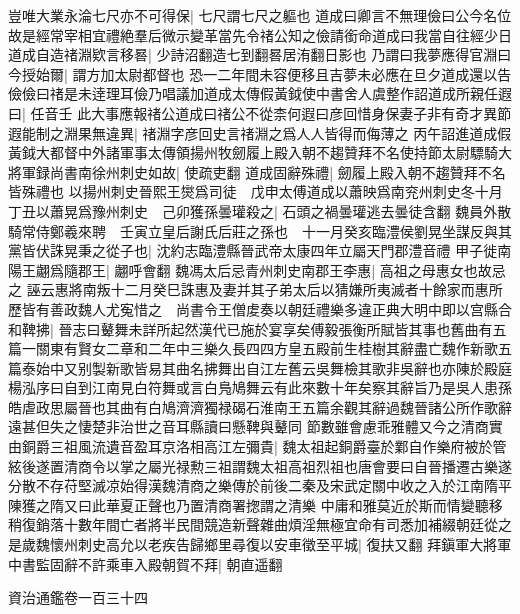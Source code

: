 豈唯大業永淪七尺亦不可得保|{
	七尺謂七尺之軀也}
道成曰卿言不無理儉曰公今名位故是經常宰相宜禮絶羣后微示變革當先令禇公知之儉請銜命道成曰我當自往經少日道成自造禇淵欵言移晷|{
	少詩沼翻造七到翻晷居洧翻日影也}
乃謂曰我夢應得官淵曰今授始爾|{
	謂方加太尉都督也}
恐一二年間未容便移且吉夢未必應在旦夕道成還以告儉儉曰禇是未逹理耳儉乃唱議加道成太傳假黃鉞使中書舍人虞整作詔道成所親任遐曰|{
	任音壬}
此大事應報禇公道成曰禇公不從柰何遐曰彦回惜身保妻子非有奇才異節遐能制之淵果無違異|{
	禇淵字彦回史言禇淵之爲人人皆得而侮薄之}
丙午詔進道成假黃鉞大都督中外諸軍事太傳領揚州牧劒履上殿入朝不趨贊拜不名使持節太尉驃騎大將軍録尚書南徐州刺史如故|{
	使疏吏翻}
道成固辭殊禮|{
	劒履上殿入朝不趨贊拜不名皆殊禮也}
以揚州刺史晉熙王爕爲司徒　戊申太傅道成以蕭映爲南兖州刺史冬十月丁丑以蕭晃爲豫州刺史　己卯獲孫曇瓘殺之|{
	石頭之禍曇瓘逃去曇徒含翻}
魏員外散騎常侍鄭羲來聘　壬寅立皇后謝氏后莊之孫也　十一月癸亥臨澧侯劉晃坐謀反與其黨皆伏誅晃秉之從子也|{
	沈約志臨澧縣晉武帝太康四年立屬天門郡澧音禮}
甲子徙南陽王翽爲隨郡王|{
	翽呼會翻}
魏馮太后忌青州刺史南郡王李惠|{
	高祖之母惠女也故忌之}
誣云惠將南叛十二月癸巳誅惠及妻并其子弟太后以猜嫌所夷滅者十餘家而惠所歷皆有善政魏人尤寃惜之　尚書令王僧䖍奏以朝廷禮樂多違正典大明中即以宫縣合和鞞拂|{
	晉志曰鼙舞未詳所起然漢代已施於宴享矣傅毅張衡所賦皆其事也舊曲有五篇一關東有賢女二章和二年中三樂久長四四方皇五殿前生桂樹其辭盡亡魏作新歌五篇泰始中又别製新歌皆易其曲名拂舞出自江左舊云吳舞檢其歌非吳辭也亦陳於殿庭楊泓序曰自到江南見白符舞或言白鳬鳩舞云有此來數十年矣察其辭旨乃是吳人患孫皓虐政思屬晉也其曲有白鳩濟濟獨禄碣石淮南王五篇余觀其辭過魏晉諸公所作歌辭遠甚但失之悽楚非治世之音耳縣讀曰懸鞞與鼙同}
節數雖會慮乖雅體又今之清商實由銅爵三祖風流遺音盈耳京洛相高江左彌貴|{
	魏太祖起銅爵臺於鄴自作樂府被於管絃後遂置清商令以掌之屬光禄勲三祖謂魏太祖高祖烈祖也唐會要曰自晉播遷古樂遂分散不存苻堅滅凉始得漢魏清商之樂傳於前後二秦及宋武定關中收之入於江南隋平陳獲之隋又曰此華夏正聲也乃置清商署揔謂之清樂}
中庸和雅莫近於斯而情變聽移稍復銷落十數年間亡者將半民間競造新聲雜曲煩淫無極宜命有司悉加補綴朝廷從之　是歲魏懷州刺史高允以老疾告歸鄉里尋復以安車徵至平城|{
	復扶又翻}
拜鎭軍大將軍中書監固辭不許乘車入殿朝賀不拜|{
	朝直遥翻}


資治通鑑卷一百三十四
